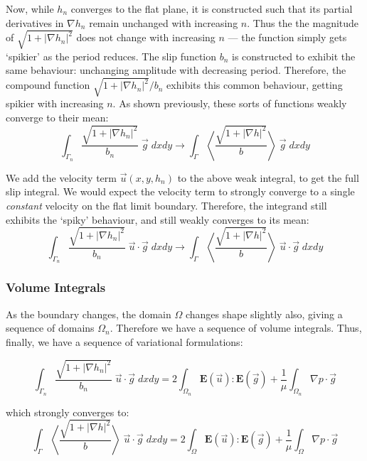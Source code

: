 \documentclass[a4paper]{report}
\begin{document}
Now, while $h_n$ converges to the flat plane, it is constructed such that its partial derivatives in $\nabla h_n$ remain unchanged with increasing $n$.
Thus the the magnitude of $\sqrt{1 + \lvert \nabla h_n \rvert^2}$ does not change with increasing $n$ --- the function simply gets `spikier' as the period reduces.
The slip function $b_n$ is constructed to exhibit the same behaviour: unchanging amplitude with decreasing period.
Therefore, the compound function $\sqrt{1 + \lvert \nabla h_n \rvert^2} /b_n$ exhibits this common behaviour, getting spikier with increasing $n$.
As shown previously, these sorts of functions weakly converge to their mean:
\begin{equation}
\int_{\Gamma_n} \frac{\sqrt{1 + \lvert \nabla h_n \rvert^2}}{b_n} \;
\vec{g}\;dxdy \to
\int_{\Gamma} \left< \frac{\sqrt{1 + \lvert \nabla h \rvert^2}}{b} \right> \;
\vec{g} \;dxdy
\end{equation}

We add the velocity term $\vec{u}(x,y,h_n)$ to the above weak integral, to get the full slip integral.  
We would expect the velocity term to strongly converge to a single \emph{constant} velocity on the flat limit boundary.  Therefore, the integrand still exhibits the `spiky' behaviour, and still weakly converges to its mean:
\begin{equation}
\int_{\Gamma_n} \frac{\sqrt{1 + \lvert \nabla h_n \rvert^2}}{b_n} \;
\vec{u} \cdot \vec{g}\;dxdy \to
\int_{\Gamma} \left< \frac{\sqrt{1 + \lvert \nabla h \rvert^2}}{b} \right> \;
\vec{u} \cdot \vec{g} \;dxdy
\end{equation}

\subsubsection*{Volume Integrals}

As the boundary changes, the domain $\Omega$ changes shape slightly also, giving a sequence of domains $\Omega_n$.  Therefore we have a sequence of volume integrals.  Thus, finally, we have a sequence of variational formulations:

\begin{equation}
\int_{\Gamma_n} \frac{\sqrt{1 + \lvert \nabla h_n \rvert^2}}{b_n} \;
\vec{u} \cdot \vec{g}\;dxdy = 
2 \int_{\Omega_n} \mathbf{E}(\vec{u}) : \mathbf{E}(\vec{g}) +
\frac{1}{\mu} \int_{\Omega_n}  \nabla p \cdot \vec{g}
\end{equation}

which strongly converges to:
\begin{equation}
\int_{\Gamma} \left< \frac{\sqrt{1 + \lvert \nabla h \rvert^2}}{b} \right> \;
\vec{u} \cdot \vec{g} \;dxdy = 
2 \int_{\Omega} \mathbf{E}(\vec{u}) : \mathbf{E}(\vec{g}) +
\frac{1}{\mu} \int_{\Omega}  \nabla p \cdot \vec{g}
\end{equation}
\end{document}
